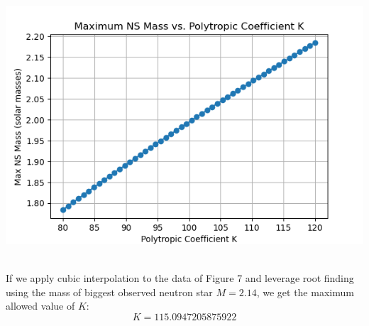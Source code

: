 \documentclass{article}
\begin{document}
\begin{center}
    \includegraphics[scale=0.65]{images_einstein/e4_max_allowed_mass_eos.png}
\end{center}
\\
If we apply cubic interpolation to the data of Figure 7 and leverage root finding using the mass of biggest observed neutron star $M = 2.14$, we get the maximum allowed value of $K$:
\begin{equation}
    K = 115.0947205875922
\end{equation}
\end{document}

